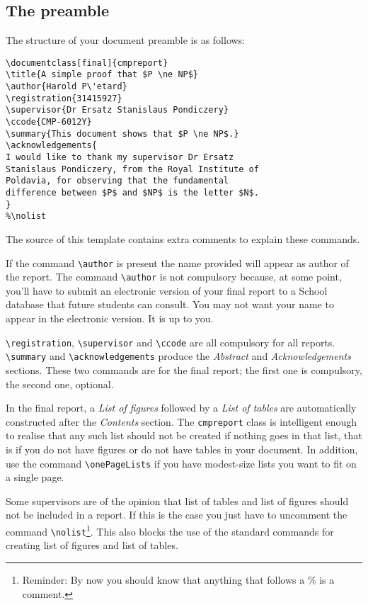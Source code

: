 \documentclass[final]{cmpreport}
\begin{document}
\subsection{The preamble}

The structure of your document preamble is as follows:
\begin{verbatim}
\documentclass[final]{cmpreport}
\title{A simple proof that $P \ne NP$}
\author{Harold P\'etard}
\registration{31415927}
\supervisor{Dr Ersatz Stanislaus Pondiczery}
\ccode{CMP-6012Y}
\summary{This document shows that $P \ne NP$.}
\acknowledgements{
I would like to thank my supervisor Dr Ersatz 
Stanislaus Pondiczery, from the Royal Institute of 
Poldavia, for observing that the fundamental 
difference between $P$ and $NP$ is the letter $N$.
}
%\nolist
\end{verbatim}
The source of this template contains extra comments to explain these commands.



If the command \verb/\author/ is present the name provided will appear as author of the report. The command \verb/\author/ is not compulsory because, at some point, you'll have  to submit an electronic  version of your final report to a School database that future students can consult. You may not want your name to appear in the electronic version. It is up to you. 

\verb/\registration/, \verb/\supervisor/ and \verb/\ccode/ are all compulsory for all reports. \verb/\summary/ and \verb/\acknowledgements/ produce the \emph{Abstract} and \emph{Acknowledgements} sections. These two commands are for the final report; the first one is compulsory, the second one, optional.

In the final report, a \emph{List of figures} followed by a \emph{List of tables} are automatically constructed after the \emph{Contents} section. The \verb/cmpreport/ class is intelligent enough to realise that any such list should not be created if nothing goes in that list, that is if you do not have figures or do not have tables in your document. In addition, use the command \verb/\onePageLists/ if you have modest-size lists you want to fit on a single page.

Some supervisors are of the opinion that list of tables and list of figures should not be included in a report. If this is the case you just have to uncomment the command \verb/\nolist/\footnote{Reminder: By now you should know that anything that follows a \% is a comment.}. This also blocks the use of the standard \LaTeXe{} commands for creating list of figures and list of tables. 
\end{document}
